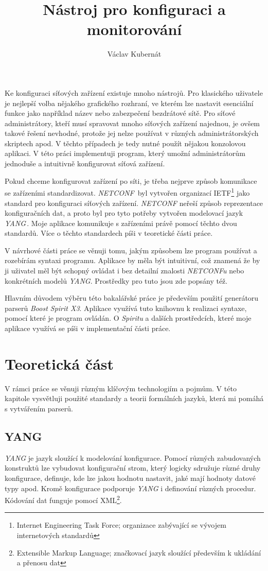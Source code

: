 \documentclass[thesis=B,czech,hidelinks]{FITthesis}[2019/03/06]
\title{Nástroj pro konfiguraci a monitorování}
\author{Václav Kubernát}
\begin{document}
\begin{introduction}
Ke konfiguraci síťových zařízení existuje mnoho nástrojů. Pro klasického uživatele je nejlepší volba nějakého grafického rozhraní, ve kterém lze nastavit esenciální funkce jako například název nebo zabezpečení bezdrátové sítě. Pro síťové administrátory, kteří musí spravovat mnoho síťových zařízení najednou, je ovšem takové řešení nevhodné, protože jej nelze používat v různých administrátorských skriptech apod. V těchto případech je tedy nutné použít nějakou konzolovou aplikaci. V této práci implementuji program, který umožní administrátorům jednoduše a intuitivně konfigurovat síťová zařízení.

Pokud chceme konfigurovat zařízení po síti, je třeba nejprve způsob komunikace se zařízeními standardizovat. \textit{NETCONF}\,\cite{rfcNetconf} byl vytvořen organizací IETF\footnote{Internet Engineering Task Force; organizace zabývající se vývojem internetových standardů} jako standard pro konfiguraci síťových zařízení. \textit{NETCONF} neřeší způsob reprezentace konfiguračních dat, a proto byl pro tyto potřeby vytvořen modelovací jazyk \textit{YANG}\,\cite{rfcYang}. Moje aplikace komunikuje s zařízeními právě pomocí těchto dvou standardů. Více o těchto standardech píši v teoretické části práce.

V návrhové části práce se věnuji tomu, jakým způsobem lze program používat a rozebírám syntaxi programu. Aplikace by měla být intuitivní, což znamená že by ji uživatel měl být schopný ovládat i bez detailní znalosti \textit{NETCONFu} nebo konkrétních modelů \textit{YANG}. Prostředky pro tuto  jsou zde popsány též.

Hlavním důvodem výběru této bakalářské práce je především použití generátoru parserů \textit{Boost Spirit X3}. Aplikace využívá tuto knihovnu k realizaci syntaxe, pomocí které je program ovládán. O \textit{Spiritu} a dalších prostředcích, které moje aplikace využívá se píši v implementační části práce.
\end{introduction}

\chapter{Teoretická část}
V rámci práce se věnuji různým klíčovým technologiím a pojmům. V této kapitole vysvětluji použité standardy a teorii formálních jazyků, která mi pomáhá s vytvářením parserů.


\section{YANG}
\textit{YANG} je jazyk sloužící k modelování konfigurace. Pomocí různých zabudovaných konstruktů lze vybudovat konfigurační strom, který logicky sdružuje různé druhy konfigurace, definuje, kde lze jakou hodnotu nastavit, jaké mají hodnoty datové typy apod. Kromě konfigurace podporuje \textit{YANG} i definování různých procedur. Kódování dat funguje pomocí XML\footnote{Extensible Markup Language; značkovací jazyk sloužící především k ukládání a přenosu dat}\@.
\end{document}
